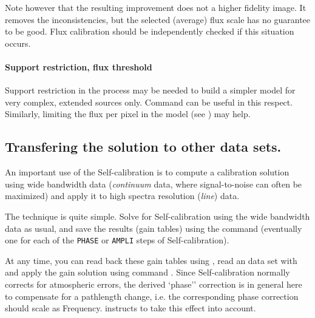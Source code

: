 Note however that the resulting improvement does not a higher fidelity
image. It removes the inconsistencies, but the selected (average) flux scale
has no guarantee to be good. Flux calibration should be independently
checked if this situation occurs.

\paragraph{Support restriction, flux threshold}
Support restriction in the  process may be needed to build a 
simpler model for very complex, extended sources only.  Command  can
be useful in this respect. Similarly, limiting
the flux per pixel in the model (see ) may help.

\subsection{Transfering the solution to other \uv{} data sets.}
An important use of the Self-calibration is to compute a calibration solution
using wide bandwidth data (\textit{continuum} data, where signal-to-noise can 
often be maximized) and apply it to high spectra resolution (\textit{line}) data.

The technique is quite simple. Solve for Self-calibration using the wide bandwidth
data as usual, and save the results (gain tables) using the 
command (eventually one for each of the \texttt{PHASE} or \texttt{AMPLI} steps of 
Self-calibration).

At any time, you can read back these gain tables using , read
an \uv{} data set with  and apply the gain solution using command
.  Since Self-calibration normally corrects for atmospheric errors,
the derived `phase'' correction is in general here to compensate for a pathlength
change, i.e. the corresponding phase correction should scale as Frequency.  
instructs \imager{} to take this effect into account.

 
